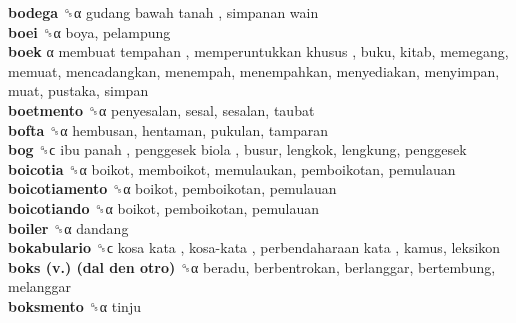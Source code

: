 \textbf{bodega} ␝α   gudang bawah tanah ,  simpanan wain   \\
\textbf{boei} ␝α  boya, pelampung  \\
\textbf{boek} α   membuat tempahan ,  memperuntukkan khusus , buku, kitab, memegang, memuat, mencadangkan, menempah, menempahkan, menyediakan, menyimpan, muat, pustaka, simpan  \\
\textbf{boetmento} ␝α  penyesalan, sesal, sesalan, taubat  \\
\textbf{bofta} ␝α  hembusan, hentaman, pukulan, tamparan  \\
\textbf{bog} ␝ϲ   ibu panah ,  penggesek biola , busur, lengkok, lengkung, penggesek  \\
\textbf{boicotia} ␝α  boikot, memboikot, memulaukan, pemboikotan, pemulauan  \\
\textbf{boicotiamento} ␝α  boikot, pemboikotan, pemulauan  \\
\textbf{boicotiando} ␝α  boikot, pemboikotan, pemulauan  \\
\textbf{boiler} ␝α  dandang  \\
\textbf{bokabulario} ␝ϲ   kosa kata ,  kosa-kata ,  perbendaharaan kata , kamus, leksikon  \\
\textbf{boks (v.) (dal den otro)} ␝α  beradu, berbentrokan, berlanggar, bertembung, melanggar  \\
\textbf{boksmento} ␝α  tinju  \\

